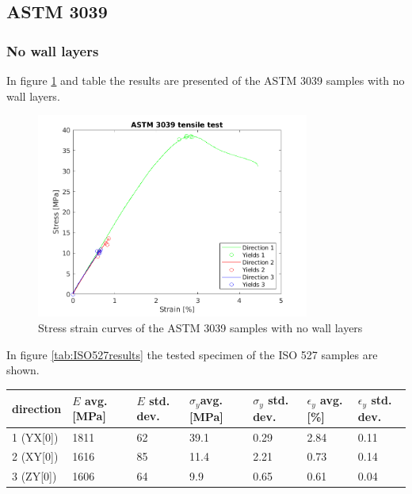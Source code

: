 \subsection{ASTM 3039}
\subsubsection{No wall layers }
In figure \ref{fig:ASTM3039results} and table \label{tab:ASTM3039results} the results are presented of the ASTM 3039 samples with no wall layers.
\begin{figure}[H]
    \centering
    \includegraphics[width=0.80\textwidth]{chapter_5_Experimentaltesting/figures/ASTMnoTensiletests.png}
    \caption{Stress strain curves of the ASTM 3039 samples with no wall layers}
    \label{fig:ASTM3039results}
\end{figure}
In figure \ref{tab:ISO527results} the tested specimen of the ISO 527 samples are shown. 

\begin{tabular}{ |p{1.5cm}||p{1cm}|p{1cm}|p{1cm}|p{1cm}|p{1cm}|p{1cm}|  }
 \hline
direction & $E$ avg. [MPa] & $E$ std. dev. & $\sigma_y$avg. [MPa] & $\sigma_y$ std. dev. & $\epsilon_y$ avg. [\%] & $\epsilon_y$   std. dev. \\
 \hline
1 (YX[0]) & 1811 & 62 & 39.1 & 0.29 & 2.84 & 0.11 \\
2 (XY[0]) & 1616 & 85 & 11.4 & 2.21 & 0.73 & 0.14 \\
3 (ZY[0]) & 1606 & 64 & 9.9 & 0.65 & 0.61 & 0.04\\
 \hline
\end{tabular}
     \label{tab:ASTM3039results}


